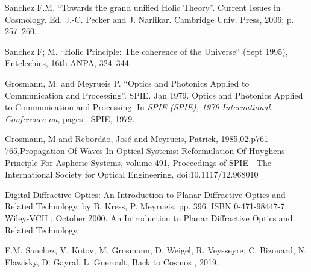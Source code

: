 \documentclass{article}
\begin{document}
\begin{thebibliography}{1}

 Sanchez F.M. ``Towards the grand unified Holic Theory''. Current
Issues in Cosmology. Ed. J.-C. Pecker and J. Narlikar. Cambridge Univ. Press,
2006; p. 257--260.

 Sanchez F; M. ``Holic Principle: The coherence of the Universe`` (Sept 1995), Entelechies, 16th ANPA, 324--344.

 Grosmann, M. and Meyrueis P. ``Optics and Photonics Applied to Communication and Processing''. SPIE.  Jan 1979.
\newblock Optics and Photonics Applied to Communication and Processing.
\newblock In {\em SPIE (SPIE), 1979 
  International Conference on}, pages . SPIE, 1979.

 Grosmann, M and Rebordão, José and Meyrueis, Patrick, 1985,02,p761--765,Propagation Of Waves In Optical Systems: Reformulation Of Huyghens Principle For Aspheric Systems,
volume 491, Proceedings of SPIE - The International Society for Optical Engineering, doi:10.1117/12.968010

 Digital Diffractive Optics: An Introduction to Planar Diffractive Optics and Related Technology, by B. Kress, P. Meyrueis, pp. 396. ISBN 0-471-98447-7. Wiley-VCH , October 2000.
\newblock An Introduction to Planar Diffractive Optics and Related Technology.

 F.M. Sanchez, V. Kotov, M. Grosmann, D. Weigel, R. Veysseyre, C. Bizouard, N. Flawisky, D. Gayral, L. Gueroult, Back to Cosmos
, 2019.

\end{thebibliography}
\end{document}
